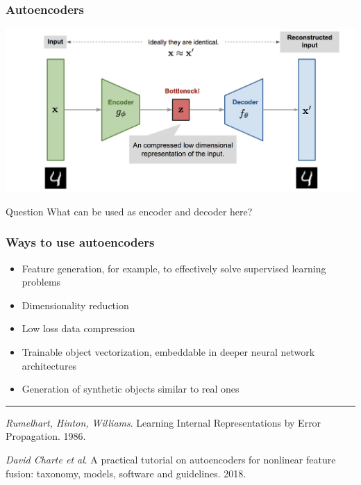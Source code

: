 \documentclass[fullscreen=true, bookmarks=true, hyperref={pdfencoding=unicode}]{beamer}
\begin{document}
\begin{frame}
  \frametitle{Autoencoders}

    \begin{center}
      \includegraphics[keepaspectratio,
                       width=0.9\paperwidth]{autoencoder-architecture.png}
    \end{center}
    
    \pause
    \begin{block}{Question}
      What can be used as encoder and decoder here?
    \end{block}
\end{frame}



\begin{frame}
  \frametitle{Ways to use autoencoders}
    \begin{itemize}
      \item Feature generation, for example, to effectively solve supervised learning problems
      \item Dimensionality reduction
      \item Low loss data compression
      \item Trainable object vectorization, embeddable in deeper neural network architectures
      \item Generation of synthetic objects similar to real ones
    \end{itemize}

  \vspace{1cm}
  \noindent\rule{8cm}{0.4pt}

  {\footnotesize
  {\it Rumelhart, Hinton, Williams}. Learning Internal Representations by Error Propagation. 1986.

  {\it David Charte et al}. A practical tutorial on autoencoders for nonlinear feature fusion: taxonomy, models, software and guidelines. 2018.}
\end{frame}
\end{document}

